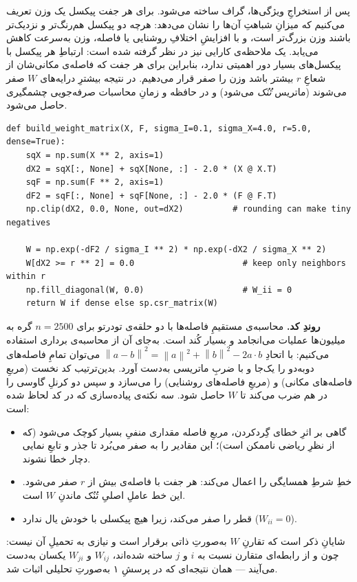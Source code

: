 \documentclass[13pt]{extarticle}
\newenvironment{pycode}{\begin{latin}\lstset{style=py}}{\end{latin}}
\newcommand{\norm}[1]{\left\lVert #1 \right\rVert}
\newcommand{\file}[1]{\lr{\texttt{#1}}}
\begin{document}
پس از استخراجِ ویژگی‌ها، گراف ساخته می‌شود. برای هر جفت پیکسل یک وزن تعریف می‌کنیم که میزانِ شباهتِ آن‌ها را نشان می‌دهد: هرچه دو پیکسل هم‌رنگ‌تر و نزدیک‌تر باشند وزن بزرگ‌تر است، و با افزایشِ اختلافِ روشنایی یا فاصله، وزن به‌سرعت کاهش می‌یابد. یک ملاحظه‌ی کارایی نیز در نظر گرفته شده است: ارتباطِ هر پیکسل با پیکسل‌های بسیار دور اهمیتی ندارد، بنابراین برای هر جفت که فاصله‌ی مکانی‌شان از شعاعِ $r$ بیشتر باشد وزن را صفر قرار می‌دهیم. در نتیجه بیشترِ درایه‌های $W$ صفر می‌شوند (ماتریس \emph{تُنُک} می‌شود) و در حافظه و زمانِ محاسبات صرفه‌جویی چشمگیری حاصل می‌شود.

\begin{pycode}
\begin{lstlisting}
def build_weight_matrix(X, F, sigma_I=0.1, sigma_X=4.0, r=5.0, dense=True):
    sqX = np.sum(X ** 2, axis=1)
    dX2 = sqX[:, None] + sqX[None, :] - 2.0 * (X @ X.T)
    sqF = np.sum(F ** 2, axis=1)
    dF2 = sqF[:, None] + sqF[None, :] - 2.0 * (F @ F.T)
    np.clip(dX2, 0.0, None, out=dX2)          # rounding can make tiny negatives

    W = np.exp(-dF2 / sigma_I ** 2) * np.exp(-dX2 / sigma_X ** 2)
    W[dX2 >= r ** 2] = 0.0                      # keep only neighbors within r
    np.fill_diagonal(W, 0.0)                    # W_ii = 0
    return W if dense else sp.csr_matrix(W)
\end{lstlisting}
\end{pycode}

\noindent\textbf{روندِ کد.} محاسبه‌ی مستقیمِ فاصله‌ها با دو حلقه‌ی تودرتو برای $n=2500$ گره به میلیون‌ها عملیات می‌انجامد و بسیار کُند است. به‌جای آن از محاسبه‌ی برداری استفاده می‌کنیم: با اتحادِ $\norm{a-b}^2=\norm{a}^2+\norm{b}^2-2a\cdot b$ می‌توان تمامِ فاصله‌های دوبه‌دو را یک‌جا و با ضربِ ماتریسی به‌دست آورد. بدین‌ترتیب کد نخست \file{dX2} (مربعِ فاصله‌های مکانی) و \file{dF2} (مربعِ فاصله‌های روشنایی) را می‌سازد و سپس دو کرنلِ گاوسی را در هم ضرب می‌کند تا $W$ حاصل شود. سه نکته‌ی پیاده‌سازی که در کد لحاظ شده است:
\begin{itemize}[leftmargin=1.6em,itemsep=1pt,topsep=2pt]
\item گاهی بر اثرِ خطای گِرد‌کردن، مربعِ فاصله مقداری منفیِ بسیار کوچک می‌شود (که از نظرِ ریاضی ناممکن است)؛ \file{clip} این مقادیر را به صفر می‌بُرد تا جذر و تابعِ نمایی دچار خطا نشوند.
\item خطِ \file{W[dX2 >= r**2] = 0} شرطِ همسایگی را اعمال می‌کند: هر جفت با فاصله‌ی بیش از $r$ صفر می‌شود. این خط عاملِ اصلیِ تُنُک ماندنِ $W$ است.
\item \file{np.fill\_diagonal(W, 0)} قطر را صفر می‌کند، زیرا هیچ پیکسلی با خودش یال ندارد ($W_{ii}=0$).
\end{itemize}
شایانِ ذکر است که تقارنِ $W$ به‌صورتِ ذاتی برقرار است و نیازی به تحمیلِ آن نیست: چون \file{dX2} و \file{dF2} از رابطه‌ای متقارن نسبت به $i$ و $j$ ساخته شده‌اند، $W_{ij}$ و $W_{ji}$ یکسان به‌دست می‌آیند --- همان نتیجه‌ای که در پرسشِ ۱ به‌صورتِ تحلیلی اثبات شد.
\end{document}

